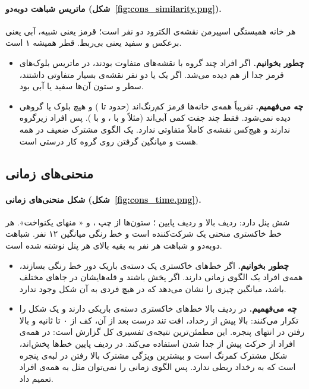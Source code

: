 
\paragraph{ماتریس شباهت دو‌به‌دو (شکل~\ref{fig:cons_similarity.png}).} هر خانه همبستگی اسپیرمن نقشه‌ی الکترود دو نفر است؛ قرمز یعنی شبیه، آبی یعنی برعکس و سفید یعنی بی‌ربط. قطر همیشه ۱ است.
\begin{itemize}
\item \textbf{چطور بخوانیم.} اگر افراد چند گروه با نقشه‌های متفاوت بودند، در ماتریس بلوک‌های قرمز جدا از هم دیده می‌شد. اگر یک یا دو نفر نقشه‌ی بسیار متفاوتی داشتند، سطر و ستون آن‌ها سفید یا آبی بود.
\item \textbf{چه می‌فهمیم.} تقریباً همه‌ی خانه‌ها قرمز کم‌رنگ‌اند (حدود  تا ) و هیچ بلوک یا گروهی دیده نمی‌شود. فقط چند جفت کمی آبی‌اند (مثلاً  و  با ، و  با ). پس افراد زیرگروه ندارند و هیچ‌کس نقشه‌ی کاملاً متفاوتی ندارد. یک الگوی مشترک ضعیف در همه هست و میانگین گرفتن روی گروه کار درستی است.
\end{itemize}


\subsection{منحنی‌های زمانی}


\paragraph{شکل منحنی‌های زمانی (شکل~\ref{fig:cons_time.png}).} شش پنل دارد: ردیف بالا  و ردیف پایین ؛ ستون‌ها از چپ ،  و « منهای یکنواخت». هر خط خاکستری منحنی یک شرکت‌کننده است و خط رنگی میانگین ۱۲ نفر. شباهت دو‌به‌دو و شباهت هر نفر به بقیه بالای هر پنل نوشته شده است.
\begin{itemize}
\item \textbf{چطور بخوانیم.} اگر خط‌های خاکستری یک دسته‌ی باریک دور خط رنگی بسازند، همه‌ی افراد یک الگوی زمانی دارند. اگر پخش باشند و قله‌هایشان در جاهای مختلف باشد، میانگین چیزی را نشان می‌دهد که در هیچ فردی به آن شکل وجود ندارد.
\item \textbf{چه می‌فهمیم.} در ردیف بالا خط‌های خاکستری دسته‌ی باریکی دارند و یک شکل را تکرار می‌کنند: بالا پیش از رخداد، افت تند درست بعد از آن، کف از ۰ تا  ثانیه و بالا رفتن در انتهای پنجره. این مطمئن‌ترین نتیجه‌ی تفسیری کل گزارش است:  در همه‌ی افراد از حرکت پیش از جدا شدن استفاده می‌کند. در ردیف پایین خط‌ها پخش‌اند، شکل مشترک کمرنگ است و بیشترین ویژگی مشترک بالا رفتن در لبه‌ی پنجره است که به رخداد ربطی ندارد. پس الگوی زمانی  را نمی‌توان مثل  به همه‌ی افراد تعمیم داد.
\end{itemize}

